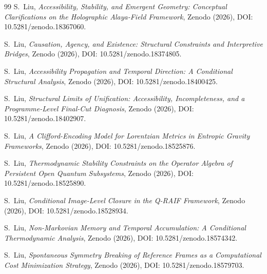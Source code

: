 \documentclass[12pt,a4paper,openany]{book}
\begin{document}
\begin{thebibliography}{99}
S.~Liu, \emph{Accessibility, Stability, and Emergent Geometry: Conceptual Clarifications on the Holographic Alaya-Field Framework}, Zenodo (2026), DOI: 10.5281/zenodo.18367060.

S.~Liu, \emph{Causation, Agency, and Existence: Structural Constraints and Interpretive Bridges}, Zenodo (2026), DOI: 10.5281/zenodo.18374805.

S.~Liu, \emph{Accessibility Propagation and Temporal Direction: A Conditional Structural Analysis}, Zenodo (2026), DOI: 10.5281/zenodo.18400425.

S.~Liu, \emph{Structural Limits of Unification: Accessibility, Incompleteness, and a Programme-Level Final-Cut Diagnosis}, Zenodo (2026), DOI: 10.5281/zenodo.18402907.

S.~Liu, \emph{A Clifford-Encoding Model for Lorentzian Metrics in Entropic Gravity Frameworks}, Zenodo (2026), DOI: 10.5281/zenodo.18525876.

S.~Liu, \emph{Thermodynamic Stability Constraints on the Operator Algebra of Persistent Open Quantum Subsystems}, Zenodo (2026), DOI: 10.5281/zenodo.18525890.

S.~Liu, \emph{Conditional Image-Level Closure in the Q-RAIF Framework}, Zenodo (2026), DOI: 10.5281/zenodo.18528934.

S.~Liu, \emph{Non-Markovian Memory and Temporal Accumulation: A Conditional Thermodynamic Analysis}, Zenodo (2026), DOI: 10.5281/zenodo.18574342.

S.~Liu, \emph{Spontaneous Symmetry Breaking of Reference Frames as a Computational Cost Minimization Strategy}, Zenodo (2026), DOI: 10.5281/zenodo.18579703.

\end{thebibliography}
\end{document}
